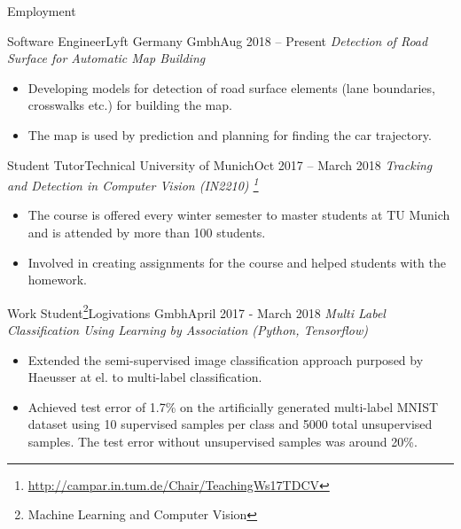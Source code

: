 \documentclass[]{mcdowellcv}
\begin{document}
    \begin{cvsection}{Employment}

            \begin{cvsubsection}{Software Engineer}{Lyft Germany Gmbh}{Aug 2018 -- Present}    
        \textit{Detection of Road Surface for Automatic Map Building}
            \begin{itemize}
                \item Developing models for detection of road surface elements (lane boundaries, crosswalks etc.) for building the map.
                \item The map is used by prediction and planning for finding the car trajectory.
            \end{itemize}
        \end{cvsubsection}
    
            \begin{cvsubsection}{Student Tutor}{Technical University of Munich}{Oct 2017 -- March 2018}    
        \textit{Tracking and Detection in Computer Vision (IN2210) \footnote{\href{http://campar.in.tum.de/Chair/TeachingWs17TDCV}{http://campar.in.tum.de/Chair/TeachingWs17TDCV}}}
            \begin{itemize}
                \item The course is offered every winter semester to master students at TU Munich and is attended by more than 100 students. 
                \item Involved in creating assignments for the course and helped students with the homework. 
            \end{itemize}
        \end{cvsubsection}
    
        \begin{cvsubsection}{Work Student\footnote{Machine Learning and Computer Vision\label{ws}}}{Logivations Gmbh}{April 2017 - March 2018}
            \textit{Multi Label Classification Using Learning by Association (Python, Tensorflow)}
            \begin{itemize}
                \item Extended the semi-supervised image classification approach purposed by Haeusser at el. \cite{haeusser-cvpr-17} to multi-label classification.
                \item Achieved test error of 1.7\% on the artificially generated multi-label MNIST dataset using 10 supervised samples per class and 5000 total unsupervised samples. The test error without unsupervised samples was around 20\%.
            \end{itemize}
                

\end{cvsubsection}
\end{cvsection}
\end{document}

